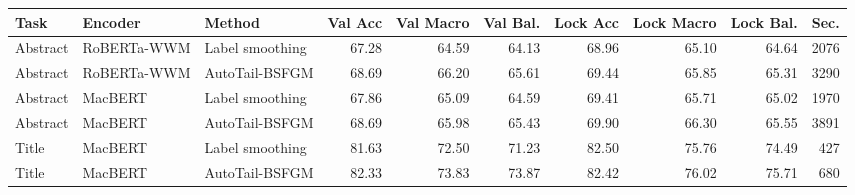 \scriptsize
\setlength{\tabcolsep}{2.2pt}
\begin{tabular}{@{}lllrrrrrrr@{}}
\toprule
Task & Encoder & Method & Val Acc & Val Macro & Val Bal. & Lock Acc & Lock Macro & Lock Bal. & Sec. \\
\midrule
Abstract & RoBERTa-WWM & Label smoothing & 67.28 & 64.59 & 64.13 & 68.96 & 65.10 & 64.64 & 2076 \\
Abstract & RoBERTa-WWM & AutoTail-BSFGM & 68.69 & 66.20 & 65.61 & 69.44 & 65.85 & 65.31 & 3290 \\
Abstract & MacBERT & Label smoothing & 67.86 & 65.09 & 64.59 & 69.41 & 65.71 & 65.02 & 1970 \\
Abstract & MacBERT & AutoTail-BSFGM & 68.69 & 65.98 & 65.43 & 69.90 & 66.30 & 65.55 & 3891 \\
Title & MacBERT & Label smoothing & 81.63 & 72.50 & 71.23 & 82.50 & 75.76 & 74.49 & 427 \\
Title & MacBERT & AutoTail-BSFGM & 82.33 & 73.83 & 73.87 & 82.42 & 76.02 & 75.71 & 680 \\
\bottomrule
\end{tabular}
